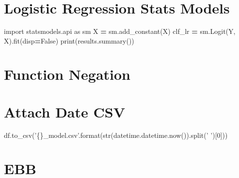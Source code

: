 \documentclass[]{book}
\newenvironment{Shaded}{\begin{snugshade}}{\end{snugshade}}
\newcommand{\BuiltInTok}[1]{#1}
\newcommand{\DecValTok}[1]{\textcolor[rgb]{0.00,0.00,0.81}{#1}}
\newcommand{\ImportTok}[1]{#1}
\newcommand{\KeywordTok}[1]{\textcolor[rgb]{0.13,0.29,0.53}{\textbf{#1}}}
\newcommand{\NormalTok}[1]{#1}
\newcommand{\OperatorTok}[1]{\textcolor[rgb]{0.81,0.36,0.00}{\textbf{#1}}}
\newcommand{\SpecialCharTok}[1]{\textcolor[rgb]{0.00,0.00,0.00}{#1}}
\newcommand{\StringTok}[1]{\textcolor[rgb]{0.31,0.60,0.02}{#1}}
\newcommand{\VariableTok}[1]{\textcolor[rgb]{0.00,0.00,0.00}{#1}}
\begin{document}
\hypertarget{logistic-regression-stats-models}{%
\section{Logistic Regression Stats Models}\label{logistic-regression-stats-models}}

\begin{Shaded}
\begin{Highlighting}[]
\ImportTok{import}\NormalTok{ statsmodels.api }\ImportTok{as}\NormalTok{ sm}
\NormalTok{X }\OperatorTok{=}\NormalTok{ sm.add_constant(X)}
\NormalTok{clf_lr }\OperatorTok{=}\NormalTok{ sm.Logit(Y, X).fit(disp}\OperatorTok{=}\VariableTok{False}\NormalTok{)}
\BuiltInTok{print}\NormalTok{(results.summary())}
\end{Highlighting}
\end{Shaded}

\hypertarget{function-negation}{%
\section{Function Negation}\label{function-negation}}

\begin{Shaded}
\end{Shaded}

\hypertarget{attach-date-csv}{%
\section{Attach Date CSV}\label{attach-date-csv}}

\begin{Shaded}
\begin{Highlighting}[]
\NormalTok{df.to_csv(}\StringTok{'}\SpecialCharTok{\{\}}\StringTok{_model.csv'}\NormalTok{.}\BuiltInTok{format}\NormalTok{(}\BuiltInTok{str}\NormalTok{(datetime.datetime.now()).split(}\StringTok{' '}\NormalTok{)[}\DecValTok{0}\NormalTok{]))}
\end{Highlighting}
\end{Shaded}

\hypertarget{ebb}{%
\section{EBB}\label{ebb}}
\end{document}
